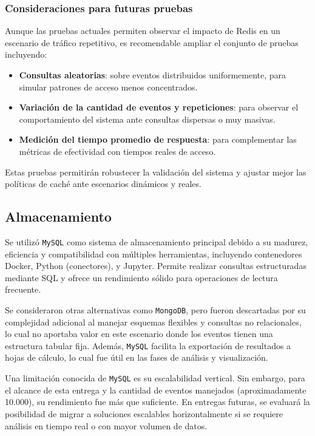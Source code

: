 \documentclass[12pt]{article}
\begin{document}
\subsubsection*{Consideraciones para futuras pruebas}

Aunque las pruebas actuales permiten observar el impacto de Redis en un escenario de tráfico repetitivo, es recomendable ampliar el conjunto de pruebas incluyendo:

\begin{itemize}
    \item \textbf{Consultas aleatorias}: sobre eventos distribuidos uniformemente, para simular patrones de acceso menos concentrados.
    \item \textbf{Variación de la cantidad de eventos y repeticiones}: para observar el comportamiento del sistema ante consultas dispersas o muy masivas.
    \item \textbf{Medición del tiempo promedio de respuesta}: para complementar las métricas de efectividad con tiempos reales de acceso.
\end{itemize}

Estas pruebas permitirán robustecer la validación del sistema y ajustar mejor las políticas de caché ante escenarios dinámicos y reales.


\subsection{Almacenamiento}

Se utilizó \texttt{MySQL} como sistema de almacenamiento principal debido a su madurez, eficiencia y compatibilidad con múltiples herramientas, incluyendo contenedores Docker, Python (conectores), y Jupyter. Permite realizar consultas estructuradas mediante SQL y ofrece un rendimiento sólido para operaciones de lectura frecuente.

Se consideraron otras alternativas como \texttt{MongoDB}, pero fueron descartadas por su complejidad adicional al manejar esquemas flexibles y consultas no relacionales, lo cual no aportaba valor en este escenario donde los eventos tienen una estructura tabular fija. Además, \texttt{MySQL} facilita la exportación de resultados a hojas de cálculo, lo cual fue útil en las fases de análisis y visualización.

Una limitación conocida de \texttt{MySQL} es su escalabilidad vertical. Sin embargo, para el alcance de esta entrega y la cantidad de eventos manejados (aproximadamente 10.000), su rendimiento fue más que suficiente. En entregas futuras, se evaluará la posibilidad de migrar a soluciones escalables horizontalmente si se requiere análisis en tiempo real o con mayor volumen de datos.
\end{document}
